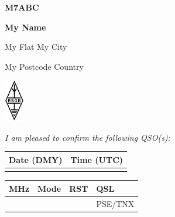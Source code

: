 \documentclass[a6paper,landscape,7pt]{scrartcl}
\begin{document}
\begin{multicols}{2}
    \vspace*{0cm}

    \begin{minipage}{2cm}
    {\huge \textbf{M7ABC}} %
    
    \smallskip
    
    \textbf{My Name}
    
    \smallskip
    
    \footnotesize
    My Flat
    My City
    
    My Postcode Country
    
    \end{minipage}
    \begin{minipage}{1.3cm}
    \centering \includegraphics[width=0.9cm]{rsgb_logo_2016mono.png}
    \end{minipage}
    \hfill
    \begin{minipage}{3.5cm} %
    
    \smallskip
    
    \end{minipage}
    
    \bigskip
    \smallskip
    
    \textit{\small{I am pleased to confirm the following QSO(s):}}
    \begin{center}
    \begin{tabular}{|P{2.5cm}|P{1.5cm}|}
    \hline
    \vphantom{$\dfrac a b$} \bf Date (DMY) & \bf Time (UTC) \\
    \hline
    \hline
    \vphantom{$\dfrac b b$} & \\
    \hline
    \end{tabular}
    \begin{tabular}{|P{1cm}|P{1cm}|P{1cm}|P{1.2cm}|}
    \hline
    \vphantom{$\dfrac a b$} \bf MHz & \bf Mode & \bf RST  & \bf QSL \\
    \hline
    \hline
    \vphantom{$\dfrac b b$} & & & PSE/TNX\\
    \hline
    \end{tabular}
    

\end{center}
\end{multicols}
\end{document}
